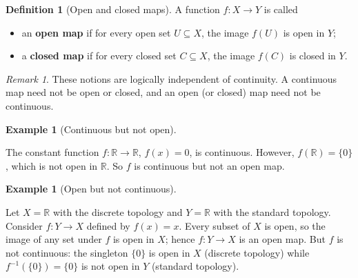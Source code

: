 \documentclass[11pt,a4paper,twoside]{book}
\theoremstyle{remark}
\newtheorem{remark}[theorem]{Remark}
\theoremstyle{definition}
\newtheorem{exampleplain}[theorem]{Example}
\theoremstyle{definition}
\newtheorem{definition}{Definition}[section]
\newenvironment{example}[1][]{%
  \begin{exampleplain}[#1]\itshape
}{%
  \end{exampleplain}
}
\begin{document}
\begin{definition}[Open and closed maps]
\label{def:open-closed-maps}
A function $f\colon X\to Y$ is called
\begin{itemize}
    \item an \textbf{open map} if for every open set $U\subseteq X$, the image
        $f(U)$ is open in $Y$;
    \item a \textbf{closed map} if for every closed set $C\subseteq X$, the
        image $f(C)$ is closed in $Y$.
\end{itemize}
\end{definition}

\begin{remark}
\label{rem:open-closed-continuous}
These notions are logically independent of continuity.  A continuous map need
not be open or closed, and an open (or closed) map need not be continuous.
\end{remark}

\begin{example}[Continuous but not open]
\label{ex:cont-not-open}
The constant function $f\colon\mathbb{R}\to\mathbb{R}$, $f(x)=0$, is
continuous.  However, $f(\mathbb{R})=\{0\}$, which is not open in
$\mathbb{R}$.  So $f$ is continuous but not an open map.
\end{example}

\begin{example}[Open but not continuous]
\label{ex:open-not-cont}
Let $X=\mathbb{R}$ with the discrete topology and $Y=\mathbb{R}$ with the
standard topology.  Consider $f\colon Y\to X$ defined by $f(x)=x$.  Every
subset of $X$ is open, so the image of any set under $f$ is open in $X$;
hence $f\colon Y\to X$ is an open map.  But $f$ is not continuous: the
singleton $\{0\}$ is open in $X$ (discrete topology) while $f^{-1}(\{0\})=\{0\}$
is not open in $Y$ (standard topology).
\end{example}
\end{document}
